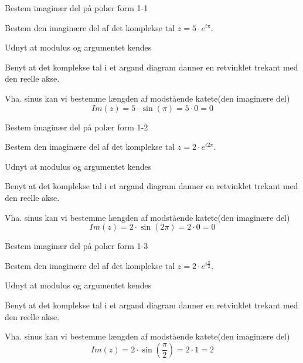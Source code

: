 \documentclass{article}
\begin{document}
\tableofcontents
\newpage

\begin{exercise}{Bestem imaginær del på polær form 1-1}

Bestem den imaginære del af det komplekse tal $z=5 \cdot e^{i \pi}$.



\hint 

Udnyt at modulus og argumentet kendes


\hint

Benyt at det komplekse tal i et argand diagram danner en retvinklet trekant med den reelle akse. 

\hint 

Vha. sinus kan vi bestemme længden af modstående katete(den imaginære del)
\[
Im(z) =  5 \cdot \sin(\pi) = 5 \cdot 0 = 0
\]

\end{exercise}

\newpage

\begin{exercise}{Bestem imaginær del på polær form 1-2}
	
	Bestem den imaginære del af det komplekse tal $z=2 \cdot e^{i 2\pi}$.
	
	
	
	\hint 
	
	Udnyt at modulus og argumentet kendes
	
	
	\hint
	
	Benyt at det komplekse tal i et argand diagram danner en retvinklet trekant med den reelle akse. 
	
	\hint 
	
	Vha. sinus kan vi bestemme længden af modstående katete(den imaginære del)
	\[
	Im(z) =  2 \cdot \sin(2\pi) = 2 \cdot 0 = 0
	\]
	
\end{exercise}

\newpage

\begin{exercise}{Bestem imaginær del på polær form 1-3}
	
	Bestem den imaginære del af det komplekse tal $z=2 \cdot e^{i \frac{\pi}{2}}$.
	
	
	
	\hint 
	
	Udnyt at modulus og argumentet kendes
	
	
	\hint
	
	Benyt at det komplekse tal i et argand diagram danner en retvinklet trekant med den reelle akse. 
	
	\hint 
	
	Vha. sinus kan vi bestemme længden af modstående katete(den imaginære del)
	\[
	Im(z) =  2 \cdot \sin\left(\frac{\pi}{2}\right) = 2 \cdot 1 = 2
	\]
	
\end{exercise}
\end{document}
